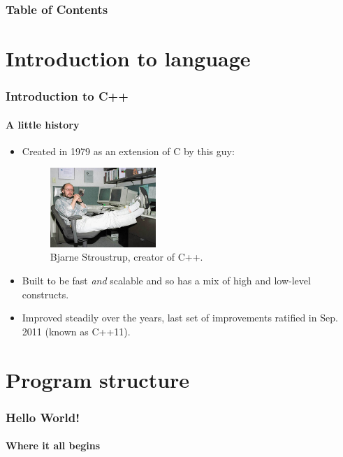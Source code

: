 \documentclass{beamer}
\subtitle{Session 0: Basics}
\begin{document}
\frame{\titlepage}

\begin{frame}
\frametitle{Table of Contents}
\tableofcontents
\end{frame}

\section{Introduction to language}

\begin{frame}
	\frametitle{Introduction to C++}
	\framesubtitle{A little history}
	\begin{itemize}
	  \item<1->{Created in 1979 as an extension of C by this guy:\pause
		\begin{figure}
			\includegraphics[height=30mm]{./figs/BjarneStroustrup.eps}
			\caption{Bjarne Stroustrup, creator of C++.}
		\end{figure}}
	  \item<3->{Built to be fast \textit{and} scalable and so has a mix of high and low-level constructs.}
	  \item<4->{Improved steadily over the years, last set of improvements ratified in Sep. 2011 (known as C++11).}
	\end{itemize}
	
\end{frame}


\section{Program structure}



\begin{frame}[fragile]
  \frametitle{Hello World!}
  \framesubtitle{Where it all begins}

  \begin{columns}[t]
    \begin{column}[T]{0.55\textwidth}	
    \end{column}
    \begin{column}[T]{0.45\textwidth}
		\end{column}
	\end{columns}
\end{frame}
\end{document}
